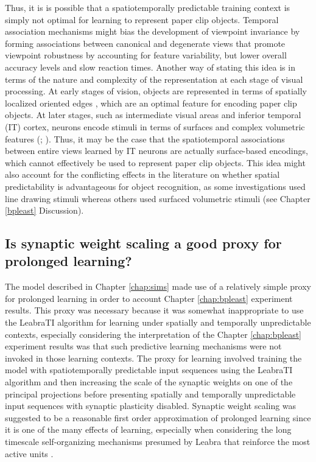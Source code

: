 \documentclass[dwyatte_dissertation.tex]{subfiles}
\begin{document}
Thus, it is is possible that a spatiotemporally predictable training context is simply not optimal for learning to represent paper clip objects. Temporal association mechanisms \cite{StringerPerryRollsEtAl06,WallisBaddeley97,IsikLeiboPoggio12,WallisBulthoff01,WallisBackusLangerEtAl09} might bias the development of viewpoint invariance by forming  associations between canonical and degenerate views that promote viewpoint robustness by accounting for feature variability, but lower overall accuracy levels and slow reaction times. Another way of stating this idea is in terms of the nature and complexity of the representation at each stage of visual processing. At early stages of vision, objects are represented in terms of spatially localized oriented edges \cite{HubelWiesel62}, which are an optimal feature for encoding paper clip objects. At later stages, such as intermediate visual areas and inferior temporal (IT) cortex, neurons encode stimuli in terms of surfaces and complex volumetric features (; ). Thus, it may be the case that the spatiotemporal associations between entire views learned by IT neurons \cite{SakaiMiyashita91,MeyerOlson11,CoxMeierOerteltEtAl05,LiDiCarlo08,LiDiCarlo10,LiDiCarlo12} are actually surface-based encodings, which cannot effectively be used to represent paper clip objects. This idea might also account for the conflicting effects in the literature on whether spatial predictability is advantageous for object recognition, as some investigations used line drawing stimuli \cite{LawsonHumphreysWatson94} whereas others used surfaced volumetric stimuli \cite{HarmanHumphrey99} (see Chapter \ref{bpleast} Discussion).

\subsection{Is synaptic weight scaling a good proxy for prolonged learning?} 
The model described in Chapter \ref{chap:sims} made use of a relatively simple proxy for prolonged learning in order to account Chapter \ref{chap:bpleast} experiment results. This proxy was necessary because it was somewhat inappropriate to use the LeabraTI algorithm for learning under spatially and temporally unpredictable contexts, especially considering the interpretation of the Chapter \ref{chap:bpleast} experiment results was that such predictive learning mechanisms were not invoked in those learning contexts. The proxy for learning involved training the model with spatiotemporally predictable input sequences using the LeabraTI algorithm and then increasing the scale of the synaptic weights on one of the principal projections before presenting spatially and temporally unpredictable input sequences with synaptic plasticity disabled. Synaptic weight scaling was suggested to be a reasonable first order approximation of prolonged learning since it is one of the many effects of learning, especially when considering the long timescale self-organizing mechanisms presumed by Leabra that reinforce the most active units \cite{OReillyMunakata00,OReillyMunakataFrankEtAl12}.
\end{document}
